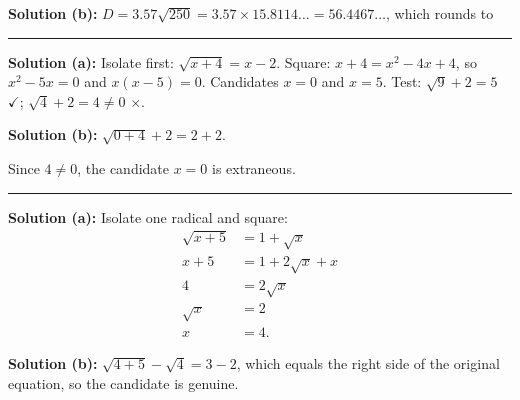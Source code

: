 \documentclass[12pt]{article}
\begin{document}
\textbf{Solution (b):} $D = 3.57\sqrt{250} = 3.57 \times 15.8114\ldots
= 56.4467\ldots$, which rounds to 

\vspace{0.2cm}\noindent\rule{\linewidth}{0.2pt}\vspace{0.2cm}


\textbf{Solution (a):} Isolate first: $\sqrt{x+4} = x - 2$. Square:
$x + 4 = x^2 - 4x + 4$, so $x^2 - 5x = 0$ and $x(x-5) = 0$. Candidates $x = 0$
and $x = 5$. Test: $\sqrt{9} + 2 = 5$ $\checkmark$; $\sqrt{4} + 2 = 4 \ne 0$
$\times$. 

\textbf{Solution (b):} $\sqrt{0+4} + 2 = 2 + 2$. 

Since $4 \ne 0$, the candidate $x = 0$ is extraneous.

\vspace{0.2cm}\noindent\rule{\linewidth}{0.2pt}\vspace{0.2cm}


\textbf{Solution (a):} Isolate one radical and square:
\begin{align*}
  \sqrt{x+5} &= 1 + \sqrt{x} \\
  x + 5 &= 1 + 2\sqrt{x} + x \\
  4 &= 2\sqrt{x} \\
  \sqrt{x} &= 2 \\
  x &= 4 .
\end{align*}

\textbf{Solution (b):} $\sqrt{4+5} - \sqrt{4} = 3 - 2$, which equals the right
side of the original equation, so the candidate is genuine.
\end{document}
